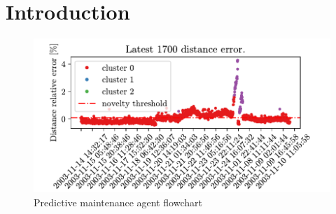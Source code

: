 \chapter{Introduction}
\lipsum[1-10]


\prntlen{\textwidth}


%  

%  

%  



%   

\begin{figure}[htbp]
  \centering
  \includegraphics{images/Figure_1.pdf}
\caption{Predictive maintenance agent flowchart}
\label{fig2}
\end{figure}